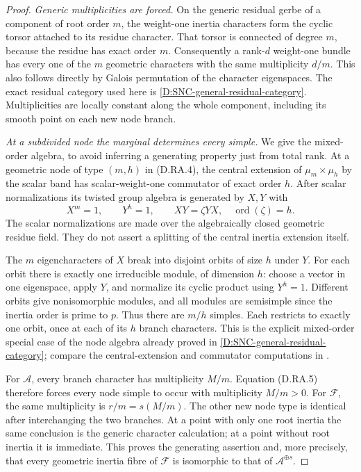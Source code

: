\begin{proof}
\emph{Generic multiplicities are forced.}
On the generic residual gerbe of a component of
root order \(m\), the weight-one inertia characters
form the cyclic torsor attached to its residue
character. That torsor is connected of degree \(m\),
because the residue has exact order \(m\).
Consequently a rank-\(d\) weight-one bundle has
every one of the \(m\) geometric characters with
the same multiplicity \(d/m\).
This also follows directly by Galois permutation
of the character eigenspaces. The exact residual
category used here is
\ref{D:SNC-general-residual-category}.
Multiplicities are locally constant along the
whole component, including its smooth point on
each new node branch.

\emph{At a subdivided node the marginal determines
every simple.}
We give the mixed-order algebra, to avoid inferring
a generating property just from total rank.
At a geometric node of type \((m,h)\) in
(D.RA.4), the central extension of
\(\mu_m\times\mu_h\) by the scalar band has
scalar-weight-one commutator of exact order \(h\).
After scalar normalizations its twisted group
algebra is generated by \(X,Y\) with
\[
        X^m=1,\qquad Y^h=1,\qquad
        XY=\zeta YX,\quad \operatorname{ord}(\zeta)=h.
                                                        \tag{D.RA.5}
\]
The scalar normalizations are made over the
algebraically closed geometric residue field.
They do not assert a splitting of the central
inertia extension itself.

The \(m\) eigencharacters of \(X\) break into
disjoint orbits of size \(h\) under \(Y\).
For each orbit there is exactly one irreducible
module, of dimension \(h\): choose a vector in
one eigenspace, apply \(Y\), and normalize its
cyclic product using \(Y^h=1\).
Different orbits give nonisomorphic modules,
and all modules are semisimple since the inertia
order is prime to \(p\).
Thus there are \(m/h\) simples. Each restricts
to exactly one orbit, once at each of its
\(h\) branch characters. This is the explicit
mixed-order special case of the node algebra
already proved in
\ref{D:SNC-general-residual-category}; compare the
central-extension and commutator computations in
\citet[Lemma 4.3.1 and Proposition 4.3.2, complete
pp.~13--14]{Lieblich2011ResidualD}.

For \(\mathcal A\), every branch character has
multiplicity \(M/m\). Equation (D.RA.5) therefore
forces every node simple to occur with multiplicity
\(M/m>0\). For \(\mathcal F\), the same multiplicity
is \(r/m=s(M/m)\). The other new node type is
identical after interchanging the two branches.
At a point with only one root inertia the same
conclusion is the generic character calculation;
at a point without root inertia it is immediate.
This proves the generating assertion and, more
precisely, that every geometric inertia fibre of
\(\mathcal F\) is isomorphic to that of
\(\mathcal A^{\oplus s}\).


\end{proof}
